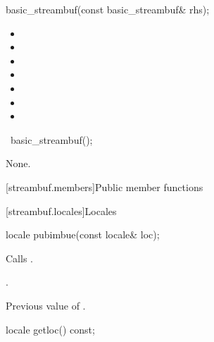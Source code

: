 %
\begin{itemdecl}
basic_streambuf(const basic_streambuf& rhs);
\end{itemdecl}

\begin{itemdescr}
\pnum
\ensures
\begin{itemize}
\item {}
\item {}
\item {}
\item {}
\item {}
\item {}
\item {}
\end{itemize}
\end{itemdescr}

%
\begin{itemdecl}
~basic_streambuf();
\end{itemdecl}

\begin{itemdescr}
\pnum
\effects
None.
\end{itemdescr}

[streambuf.members]{Public member functions}

[streambuf.locales]{Locales}

\begin{indexed}{}
\begin{itemdecl}
locale pubimbue(const locale& loc);
\end{itemdecl}
\end{indexed}

\begin{itemdescr}
\pnum
\effects
Calls
.

\pnum
\ensures
{}.

\pnum
\returns
Previous value of
.
\end{itemdescr}

\begin{indexed}{}
\begin{itemdecl}
locale getloc() const;
\end{itemdecl}
\end{indexed}


